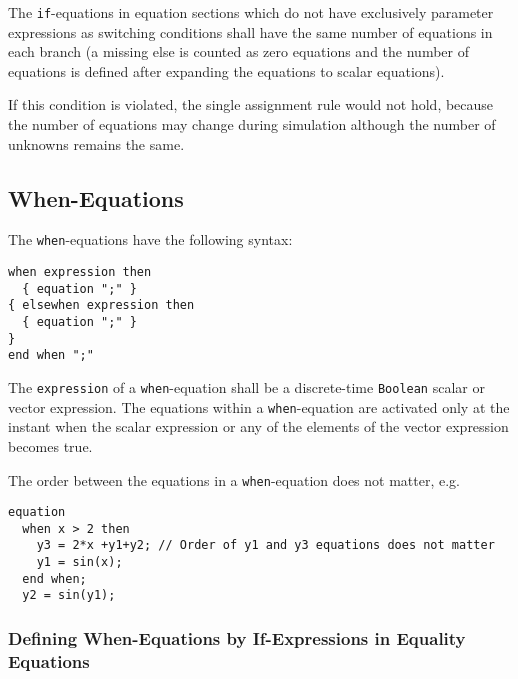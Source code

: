 The \lstinline!if!-equations in equation sections which do not have exclusively parameter expressions as switching conditions shall have the same number of equations in each branch (a missing else is counted as zero equations and the number of equations is defined after expanding the equations to scalar equations).

\begin{nonnormative}
If this condition is violated, the single assignment rule would not hold, because the number of equations may change during simulation although the number of unknowns remains the same.
\end{nonnormative}

\subsection{When-Equations}\label{when-equations}

The \lstinline!when!-equations have the following syntax:
\begin{lstlisting}[language=grammar]
when expression then
  { equation ";" }
{ elsewhen expression then
  { equation ";" }
}
end when ";"
\end{lstlisting}

The \lstinline!expression! of a \lstinline!when!-equation shall be a discrete-time \lstinline!Boolean! scalar or vector expression.
The equations within a \lstinline!when!-equation are activated only at the instant when the scalar expression or any of the elements of the vector expression becomes true.

\begin{example}
The order between the equations in a \lstinline!when!-equation does not matter, e.g.
\begin{lstlisting}[language=modelica]
equation
  when x > 2 then
    y3 = 2*x +y1+y2; // Order of y1 and y3 equations does not matter
    y1 = sin(x);
  end when;
  y2 = sin(y1);
\end{lstlisting}
\end{example}

\subsubsection{Defining When-Equations by If-Expressions in Equality Equations}\label{defining-when-equations-by-if-expressions-in-equality-equations}

